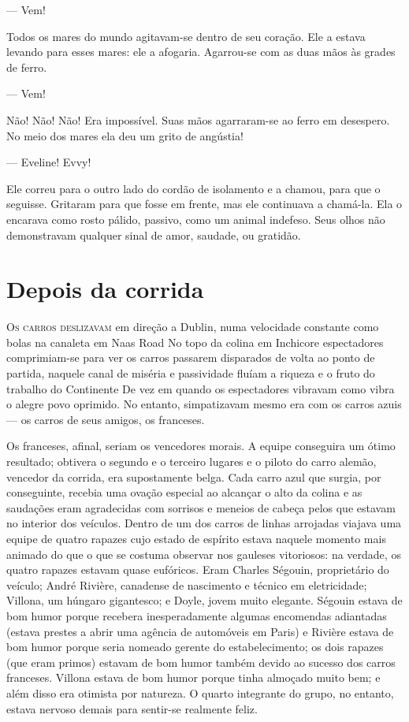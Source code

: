 --- Vem!

Todos os mares do mundo agitavam-se dentro de seu coração. Ele a
estava levando para esses mares: ele a afogaria. Agarrou-se com as
duas mãos às grades de ferro.

--- Vem!

Não! Não! Não! Era impossível. Suas mãos agarraram-se ao ferro em
desespero. No meio dos mares ela deu um grito de angústia!

--- Eveline! Evvy!

Ele correu para o outro lado do cordão de isolamento e a chamou, para
que o seguisse. Gritaram para que fosse em frente, mas ele continuava
a chamá-la. Ela o encarava como rosto pálido, passivo, como um animal
indefeso. Seus olhos não demonstravam qualquer sinal de amor,
saudade, ou gratidão.

\chapter{Depois da corrida}

\textsc{Os carros deslizavam} em direção a Dublin, numa velocidade constante
como bolas na canaleta em Naas Road No topo da colina em Inchicore
espectadores comprimiam-se para ver os carros passarem disparados de
volta ao ponto de partida, naquele canal de miséria e passividade
fluíam a riqueza e o fruto do trabalho do Continente De vez em quando
os espectadores vibravam como vibra o alegre povo oprimido. No entanto,
simpatizavam mesmo era com os carros azuis --- os carros de seus
amigos, os franceses.

Os franceses, afinal, seriam os vencedores morais. A equipe
conseguira um ótimo resultado; obtivera o segundo e o terceiro lugares
e o piloto do carro alemão, vencedor da corrida, era supostamente
belga. Cada carro azul que surgia, por conseguinte, recebia uma ovação
especial ao alcançar o alto da colina e as saudações eram agradecidas
com sorrisos e meneios de cabeça pelos que estavam no interior dos
veículos. Dentro de um dos carros de linhas arrojadas viajava uma
equipe de quatro rapazes cujo estado de espírito estava naquele
momento mais animado do que o que se costuma observar nos gauleses
vitoriosos: na verdade, os quatro rapazes estavam quase
eufóricos. Eram Charles Ségouin, proprietário do veículo; André
Rivière, canadense de
nascimento e técnico em eletricidade; Villona, um húngaro
gigantesco; e Doyle, jovem muito elegante. Ségouin estava de bom
humor porque recebera inesperadamente algumas encomendas adiantadas
(estava prestes a abrir uma agência de automóveis em Paris) e Rivière
estava de bom humor porque seria nomeado gerente do estabelecimento;
os dois rapazes (que eram primos) estavam de bom humor também devido
ao sucesso dos carros franceses. Villona estava de bom humor porque
tinha almoçado muito bem; e além disso era otimista por natureza. O
quarto integrante do grupo, no entanto, estava nervoso demais para
sentir-se realmente feliz.

